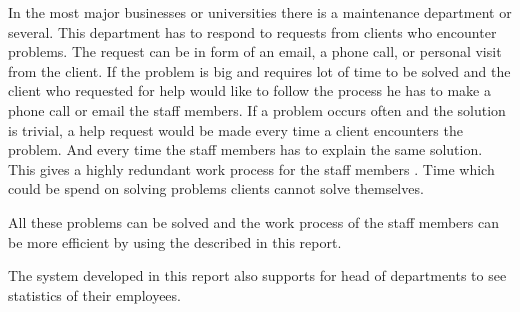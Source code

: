 In the most major businesses or universities there is a maintenance department or several. 
This department has to respond to requests from clients who encounter problems. 
The request can be in form of an email, a phone call, or personal visit from the client. 
If the problem is big and requires lot of time to be solved and the client who requested for help would like to follow the process he has to make a phone call or email the staff members. 
If a problem occurs often and the solution is trivial, a help request would be made every time a client encounters the problem. And every time the staff members has to explain the same solution. 
This gives  a highly redundant work process for the staff members . 
Time which could be spend on solving problems clients cannot solve themselves. 

All these problems can be solved and the work process of the staff members can be more efficient by using the \hdesk[] described in this report. 

The system developed in this report also supports for head of departments to see statistics of their employees.